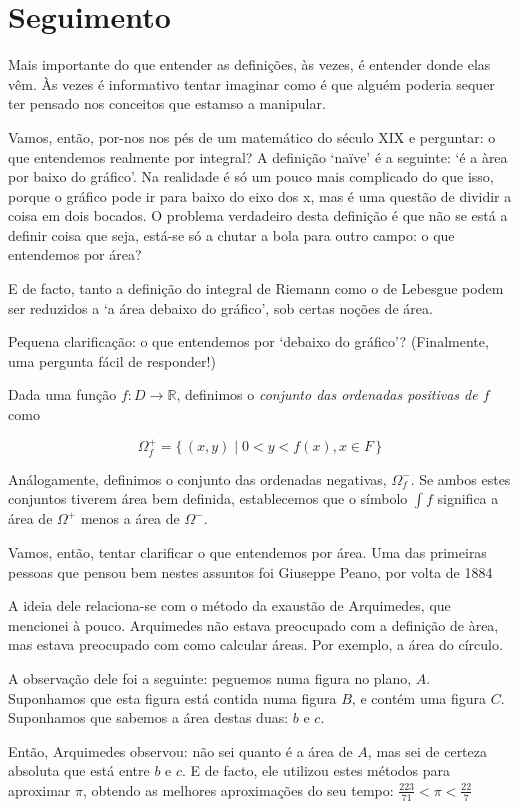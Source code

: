 \documentclass{article}
\newcommand{\R}{\mathbb{R}}
\begin{document}
\section{Seguimento}

Mais importante do que entender as definições, às vezes, é entender donde elas vêm. Às vezes é informativo tentar imaginar como é que alguém poderia sequer ter pensado nos conceitos que estamso a manipular.

Vamos, então, por-nos nos pés de um matemático do século XIX e perguntar: o que entendemos realmente por integral? A definição `naïve' é a seguinte: `é a àrea por baixo do gráfico'. Na realidade é só um pouco mais complicado do que isso, porque o gráfico pode ir para baixo do eixo dos x, mas é uma questão de dividir a coisa em dois bocados. O problema verdadeiro desta definição é que não se está a definir coisa que seja, está-se só a chutar a bola para outro campo: o que entendemos por área?

E de facto, tanto a definição do integral de Riemann como o de Lebesgue podem ser reduzidos a `a área debaixo do gráfico', sob certas noções de área.

Pequena clarificação: o que entendemos por `debaixo do gráfico'? (Finalmente, uma pergunta fácil de responder!)

Dada uma função $f : D \to \R$, definimos o \emph{conjunto das ordenadas positivas de $f$}como

\[\Omega^+_f = \{\, (x,y) \mid 0 < y < f(x), x \in F \,\}\]

Análogamente, definimos o conjunto das ordenadas negativas, $\Omega^-_f$. Se ambos estes conjuntos tiverem área bem definida, establecemos que o símbolo $\int f$ significa a área de $\Omega^+$ menos a área de $\Omega^-$.

Vamos, então, tentar clarificar o que entendemos por área. Uma das primeiras pessoas que pensou bem nestes assuntos foi Giuseppe Peano, por volta de 1884

A ideia dele relaciona-se com o método da exaustão de Arquimedes, que mencionei à pouco. Arquimedes não estava preocupado com a definição de àrea, mas estava preocupado com como calcular áreas. Por exemplo, a área do círculo.

A observação dele foi a seguinte: peguemos numa figura no plano, $A$. Suponhamos que esta figura está contida numa figura $B$, e contém uma figura $C$. Suponhamos que sabemos a área destas duas: $b$ e $c$.

Então, Arquimedes observou: não sei quanto é a área de $A$, mas sei de certeza absoluta que está entre $b$ e $c$. E de facto, ele utilizou estes métodos para aproximar $\pi$, obtendo as melhores aproximações do seu tempo: $\frac{223}{71} < \pi < \frac{22}{7}$
\end{document}
